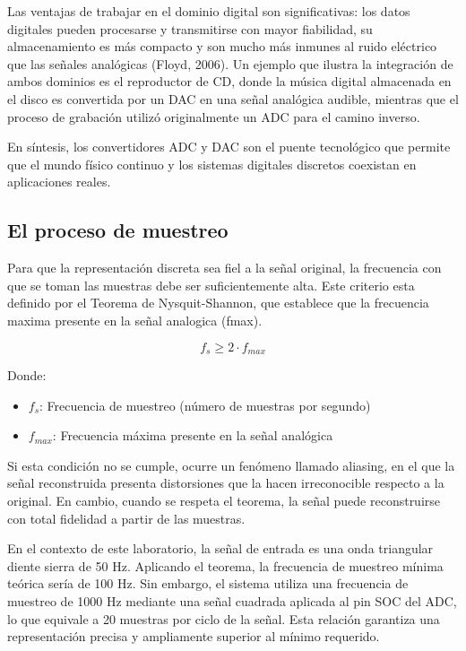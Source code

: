\documentclass[12pt,letterpaper]{article}
\begin{document}
    Las ventajas de trabajar en el dominio digital son significativas: los datos digitales pueden procesarse y transmitirse con mayor fiabilidad, su almacenamiento es más compacto y son mucho más inmunes al ruido eléctrico que las señales analógicas (Floyd, 2006). Un ejemplo que ilustra la integración de ambos dominios es el reproductor de CD, donde la música digital almacenada en el disco es convertida por un DAC en una señal analógica audible, mientras que el proceso de grabación utilizó originalmente un ADC para el camino inverso.

    En síntesis, los convertidores ADC y DAC son el puente tecnológico que permite que el mundo físico continuo y los sistemas digitales discretos coexistan en aplicaciones reales.

    \subsection{El proceso de muestreo}
    Para que la representación discreta sea fiel a la señal original, la frecuencia con que se toman las muestras debe ser suficientemente alta. Este criterio esta definido por el Teorema de Nysquit-Shannon, que establece que la frecuencia maxima presente en la señal analogica (fmax).
    
    \begin{equation}
        f_s \ge 2 \cdot f_{max}
        \label{Eq:fs}
    \end{equation}

    Donde:

    \begin{itemize}
        \item $f_s$: Frecuencia de muestreo (número de muestras por segundo)
        \item $f_{max}$: Frecuencia máxima presente en la señal analógica 
    \end{itemize}
    
    Si esta condición no se cumple, ocurre un fenómeno llamado aliasing, en el que la señal reconstruida presenta distorsiones que la hacen irreconocible respecto a la original. En cambio, cuando se respeta el teorema, la señal puede reconstruirse con total fidelidad a partir de las muestras.

    En el contexto de este laboratorio, la señal de entrada es una onda triangular diente sierra de 50 Hz. Aplicando el teorema, la frecuencia de muestreo mínima teórica sería de 100 Hz. Sin embargo, el sistema utiliza una frecuencia de muestreo de 1000 Hz mediante una señal cuadrada aplicada al pin SOC del ADC, lo que equivale a 20 muestras por ciclo de la señal. Esta relación garantiza una representación precisa y ampliamente superior al mínimo requerido.
\end{document}
